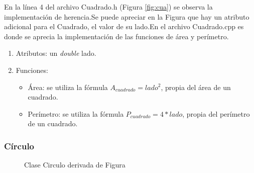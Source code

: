 \documentclass[11pt]{article}
\begin{document}
En la línea 4 del archivo Cuadrado.h (Figura \ref{fig:cua}) se observa la implementación de herencia.Se puede apreciar en la Figura que hay un atributo adicional para el Cuadrado, el valor de su lado.En el archivo Cuadrado.cpp es donde se aprecia la implementación de las funciones de área y perímetro.

\begin{enumerate}
 \item Atributos: un \textit{double} lado.
 \item Funciones:
	\begin{itemize}
    \item Área: se utiliza la fórmula $A_{cuadrado}= lado^{2}$, propia del área de un cuadrado.
    \item Perímetro: se utiliza la fórmula $P_{cuadrado}=4*lado$, propia del perímetro de un cuadrado.
    \end{itemize}
\end{enumerate}

\subsubsection{Círculo}

\begin{figure}[H]
\centering
{}
\caption{Clase Circulo derivada de Figura}
\label{fig:cir}
\end{figure}
\end{document}
